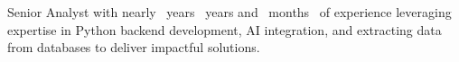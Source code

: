 \documentclass{article}
\newcommand{\displayExperience}{
  \ifnum\roundedMonths=0
    \roundedYears\ years
  \else
    \roundedYears\ years and \roundedMonths\ months
  \fi
}
\begin{document}
Senior Analyst with nearly \displayExperience\ of experience leveraging expertise in Python backend development, AI integration, and extracting data from databases to deliver impactful solutions.
\end{document}
